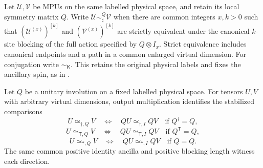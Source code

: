 \begin{definition}
    \label{def:mpu_labelled_physical_matrix_equivalence}
    \leanok
    Let $\mathcal U,\mathcal V$ be MPUs on the same labelled physical
    space, and retain its local symmetry matrix $Q$. Write
    $\mathcal U\sim^{Q}_{\sharp}\mathcal V$ when there are common
    integers $x,k>0$ such that
    $(\mathcal U^{(x)})^{[k]}$ and $(\mathcal V^{(x)})^{[k]}$ are strictly
    equivalent under the canonical $k$-site blocking of the full action
    specified by $Q\otimes I_x$. Strict equivalence includes canonical
    endpoints and a path in a common enlarged virtual dimension.
    For conjugation write $\sim_{\mathsf K}$.
    This retains the original physical labels and fixes the ancillary
    spin, as in \cite[lines~1356--1366 and 2210--2234]{Cirac2017MPU}.
\end{definition}

\begin{lemma}
    \label{lem:mpu_general_physical_matrix_equivalence_transport}
    \leanok
    Let $Q$ be a unitary involution on a fixed labelled physical space.
    For tensors $U,V$ with arbitrary virtual dimensions, output
    multiplication identifies the stabilized comparisons
    \[
        U\simeq_{\dagger,Q}V\quad\Longleftrightarrow\quad
        QU\simeq_{\dagger,I}QV\quad\text{if }Q^\dagger=Q,
    \]
    \[
        U\simeq_{{\mathsf T},Q}V\quad\Longleftrightarrow\quad
        QU\simeq_{{\mathsf T},I}QV\quad\text{if }Q^{\mathsf T}=Q,
    \]
    \[
        U\simeq_{*,Q}V\quad\Longleftrightarrow\quad
        QU\simeq_{*,I}QV\quad\text{if }\overline Q=Q.
    \]
    The same common positive identity ancilla and positive blocking
    length witness each direction.
\end{lemma}

